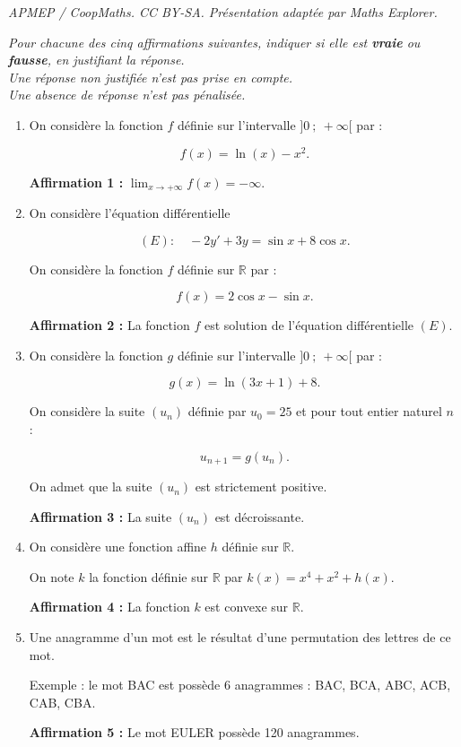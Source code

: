 \documentclass[10pt]{article}
\providecommand{\R}{\mathbb{R}}
\begin{document}
\noindent\textit{APMEP / CoopMaths. CC BY-SA. Présentation adaptée par Maths Explorer.}\par\medskip
\emph{Pour chacune des cinq affirmations suivantes, indiquer si elle est \textbf{vraie} ou \textbf{fausse}, en justifiant la réponse.\\
Une réponse non justifiée n’est pas prise en compte.\\
Une absence de réponse n’est pas pénalisée.}

\medskip

\begin{enumerate}
\item On considère la fonction $f$ définie sur l’intervalle $]0~;~ +\infty[$ par :

\[f(x) = \ln (x) - x^2.\]

\textbf{Affirmation 1 :} $\displaystyle \lim_{x \to +\infty} f(x) = -\infty$.

\item On considère l’équation différentielle 

\[(E) : \quad - 2y' + 3y = \sin x + 8\cos x.\]

On considère la fonction $f$ définie sur $\R$ par :

\[f(x) = 2\cos x - \sin x.\]

\textbf{Affirmation 2 :} La fonction $f$ est solution de l’équation différentielle $(E)$.

\item On considère la fonction $g$ définie sur l’intervalle $]0~;~+\infty[$ par :

\[g(x) = \ln (3x + 1) + 8.\]

On considère la suite $(u_n)$ définie par $u_0 = 25$ et pour tout entier naturel $n$ :

\[u_{n+1} = g(u_n).\]

On admet que la suite $(u_n)$ est strictement positive.

\textbf{Affirmation 3 :} La suite $(u_n)$ est décroissante.

\item On considère une fonction affine $h$ définie sur $\R$.

On note $k$ la fonction définie sur $\R$ par $k(x) = x^4 + x^2 + h(x)$.

\textbf{Affirmation 4 :} La fonction $k$ est convexe sur $\R$.

\item Une anagramme d'un mot est le résultat d'une permutation des lettres de ce mot.

Exemple : le mot BAC est possède 6 anagrammes : BAC, BCA, ABC, ACB, CAB, CBA.

\textbf{Affirmation 5 :} Le mot EULER possède 120 anagrammes.
\end{enumerate}
\end{document}
